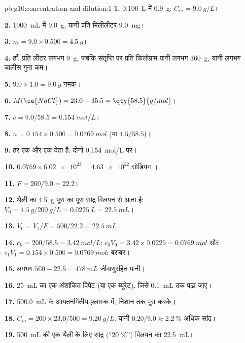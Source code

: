 \begin{solution}{pb:g10:concentration-and-dilution:1}
\textbf{1.} \qty{0.100}{L} में \qty{0.9}{g}: $C_m = \qty{9.0}{g/L}$।

\textbf{2.} \qty{1000}{mL} में \qty{9.0}{g}, यानी प्रति मिलीलीटर
\qty{9.0}{mg}।

\textbf{3.} $m = 9.0 \times 0.500 = \qty{4.5}{g}$।

\textbf{4.} हाँ: प्रति लीटर लगभग \qty{9}{g}, जबकि संतृप्ति पर प्रति किलोग्राम पानी
लगभग \qty{360}{g}, यानी लगभग चालीस गुना कम।

\textbf{5.} $9.0 \times 1.0 = \qty{9.0}{g}$ नमक।

\textbf{6.} $M(\ce{NaCl}) = 23.0 + 35.5 = \qty{58.5}{g/mol}$।

\textbf{7.} $c = 9.0 / 58.5 = \qty{0.154}{mol/L}$।

\textbf{8.} $n = 0.154 \times 0.500 = \qty{0.0769}{mol}$ (या
$4.5 / 58.5$)।

\textbf{9.} हर  एक  और एक  देता है: दोनों
\qty{0.154}{mol/L} पर।

\textbf{10.} $0.0769 \times \num{6.02e23} = \num{4.63e22}$ सोडियम ।

\textbf{11.} $F = 200 / 9.0 = 22.2$।

\textbf{12.} थैली का \qty{4.5}{g} पूरा का पूरा सांद्र विलयन से आता है:
$V_0 = \qty{4.5}{g} / \qty{200}{g/L} = \qty{0.0225}{L} =
\qty{22.5}{mL}$।

\textbf{13.} $V_0 = V_1 / F = 500 / 22.2 = \qty{22.5}{mL}$।

\textbf{14.} $c_0 = 200 / 58.5 = \qty{3.42}{mol/L}$;
$c_0 V_0 = 3.42 \times 0.0225 = \qty{0.0769}{mol}$ और
$c_1 V_1 = 0.154 \times 0.500 = \qty{0.0769}{mol}$: बराबर।

\textbf{15.} लगभग $500 - 22.5 = \qty{478}{mL}$ जीवाणुरहित पानी।

\textbf{16.} \qty{25}{mL} का एक अंशांकित पिपेट (या एक ब्यूरेट), जिसे
\qty{0.1}{mL} तक पढ़ा जाए।

\textbf{17.} \qty{500.0}{mL} के आयतनमितीय फ़्लास्क में, निशान तक पूरा करके।

\textbf{18.} $C_m = 200 \times 23.0 / 500 = \qty{9.20}{g/L}$, यानी
$0.20 / 9.0 \approx \qty{2.2}{\percent}$ अधिक सांद्र।

\textbf{19.} \qty{500}{mL} की एक थैली के लिए सांद्र (``20 \%'') विलयन का
\qty{22.5}{mL}।
\end{solution}
